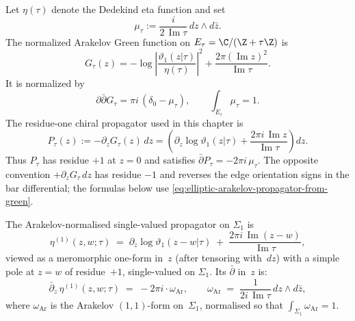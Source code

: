 \begin{definition}
\label{def:elliptic-arakelov-green-kernel}
Let $\eta(\tau)$ denote the Dedekind eta function and set
\[
 \mu_\tau
 :=
 \frac{i}{2\,\operatorname{Im}\tau}\,dz\wedge d\bar z .
\]
The normalized Arakelov Green function on
$E_\tau=\C/(\Z+\tau\Z)$ is
\begin{equation}\label{eq:elliptic-arakelov-green}
 G_\tau(z)
 =
 -\log\left|
 \frac{\vartheta_1(z|\tau)}{\eta(\tau)}
 \right|^2
 +
 \frac{2\pi(\operatorname{Im}z)^2}{\operatorname{Im}\tau}.
\end{equation}
It is normalized by
\begin{equation}\label{eq:elliptic-arakelov-ddbar}
 \partial\bar\partial G_\tau
 =
 \pi i\,(\delta_0-\mu_\tau),
 \qquad
 \int_{E_\tau}\mu_\tau=1.
\end{equation}
The residue-one chiral propagator used in this chapter is
\begin{equation}\label{eq:elliptic-arakelov-propagator-from-green}
 P_\tau(z)
 :=
 -\partial_zG_\tau(z)\,dz
 =
 \left(
 \partial_z\log\vartheta_1(z|\tau)
 +
 \frac{2\pi i\,\operatorname{Im}z}{\operatorname{Im}\tau}
 \right)dz .
\end{equation}
Thus $P_\tau$ has residue $+1$ at $z=0$ and satisfies
$\bar\partial P_\tau=-2\pi i\,\mu_\tau$. The opposite convention
$+\partial_zG_\tau\,dz$ has residue $-1$ and reverses the edge
orientation signs in the bar differential; the formulas below use
\eqref{eq:elliptic-arakelov-propagator-from-green}.
\end{definition}

\begin{proposition}
\label{prop:arakelov-genus-1-derivation}

The Arakelov-normalised single-valued propagator on $\Sigma_1$ is
\begin{equation}\label{eq:eta-1-explicit}
 \eta^{(1)}(z,w;\tau)
 \;=\;
 \partial_z \log\vartheta_1(z-w|\tau)
 \;+\;
 \frac{2\pi i\, \operatorname{Im}(z-w)}{\operatorname{Im}\tau},
\end{equation}
viewed as a meromorphic one-form in~$z$
\textup{(}after tensoring with~$dz$\textup{)}
with a simple pole at $z = w$ of residue~$+1$, single-valued on
$\Sigma_1$. Its $\bar\partial$ in~$z$ is:
\begin{equation}\label{eq:dbar-eta-1}
 \bar\partial_z\, \eta^{(1)}(z,w;\tau)
 \;=\;
 -2\pi i \cdot \omega_{\mathrm{Ar}},
 \qquad
 \omega_{\mathrm{Ar}}
 \;=\;
 \frac{1}{2i\,\operatorname{Im}\tau}\,
 dz \wedge d\bar z,
\end{equation}
where $\omega_{\mathrm{Ar}}$ is the Arakelov $(1,1)$-form on~$\Sigma_1$,
normalised so that $\int_{\Sigma_1}\omega_{\mathrm{Ar}} = 1$.
\end{proposition}

